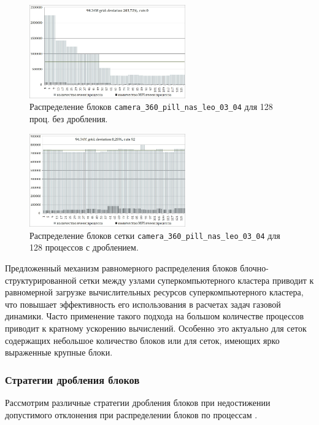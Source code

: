\begin{figure}[ht]
	\centering
	\includegraphics[width=0.6\textwidth]{./pics/text_2_withcut/chart7.jpg}
	\caption{Распределение блоков \texttt{camera\_360\_pill\_nas\_leo\_03\_04}  для 128 проц. без дробления.}
	\label{fig:text_2_withcut_chart7}
\end{figure}

\begin{figure}[ht]
	\centering
	\includegraphics[width=0.6\textwidth]{./pics/text_2_withcut/chart8.jpg}
	\caption{Распределение блоков сетки \texttt{camera\_360\_pill\_nas\_leo\_03\_04} для 128 процессов с дроблением.}
	\label{fig:text_2_withcut_chart8}
\end{figure}

Предложенный механизм равномерного распределения блоков блочно-структурированной сетки между узлами суперкомпьютерного кластера приводит к равномерной загрузке вычислительных ресурсов суперкомпьютерного кластера, что повышает эффективность его использования в расчетах задач газовой динамики. Часто применение такого подхода на большом количестве процессов приводит к кратному ускорению вычислений. Особенно это актуально для сеток содержащих небольшое количество блоков или для сеток, имеющих ярко выраженные крупные блоки.

\subsubsection{Стратегии дробления блоков}

Рассмотрим различные стратегии дробления блоков при недостижении допустимого отклонения при распределении блоков по процессам \cite{Bendersky2017Eff,Bendersky2018Block}.

